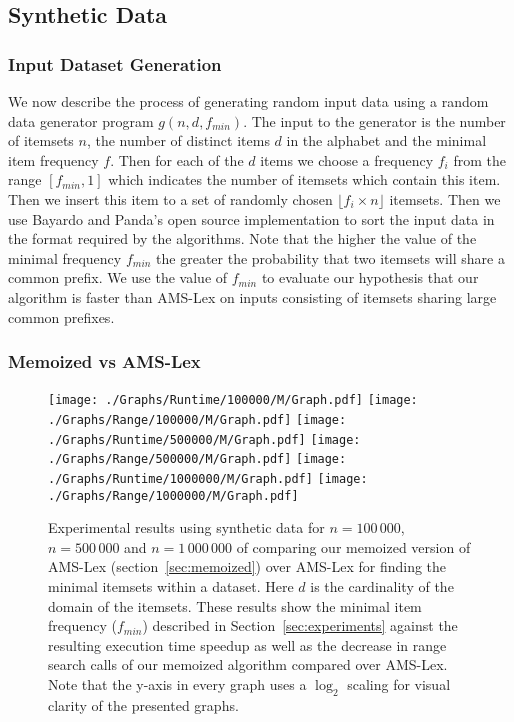 \documentclass[13pt,a4paper]{article}
\begin{document}
\subsection{Synthetic Data}
\label{sec:exp:synth}

\subsubsection{Input Dataset Generation}
We now describe the process of generating random input data using a random data generator program $g(n, d, f_{min})$. The input to the generator is the number of itemsets $n$, the number of distinct items $d$ in the alphabet and the minimal item frequency $f$. Then for each of the $d$ items we choose a frequency $f_i$ from the range $[f_{min}, 1]$ which indicates the number of itemsets which contain this item. Then we insert this item to a set of randomly chosen $ \lfloor f_i \times n \rfloor $ itemsets. Then we use Bayardo and  Panda's open source implementation to sort the input data in the format required by the algorithms. Note that the higher the value of the minimal frequency $f_{min}$ the greater the probability that two itemsets will share a common prefix. We use the value of $f_{min}$ to evaluate our hypothesis that our algorithm is faster than AMS-Lex on inputs consisting of itemsets sharing large common prefixes.

\subsubsection{Memoized vs AMS-Lex}
\label{sec:exp:synth:memo_AMS}

\begin{figure} [t]
	\centering
	\texttt{[image: ./Graphs/Runtime/100000/M/Graph.pdf]}
	\texttt{[image: ./Graphs/Range/100000/M/Graph.pdf]}
	\texttt{[image: ./Graphs/Runtime/500000/M/Graph.pdf]}
	\texttt{[image: ./Graphs/Range/500000/M/Graph.pdf]}
	\texttt{[image: ./Graphs/Runtime/1000000/M/Graph.pdf]}
	\texttt{[image: ./Graphs/Range/1000000/M/Graph.pdf]}
	\caption{Experimental results using synthetic data for $n = 100\,000$, $n = 500\,000$ and $n = 1\,000\,000$ of comparing our memoized version of AMS-Lex (section~\ref{sec:memoized}) over AMS-Lex for finding the minimal itemsets within a dataset. Here $d$ is the cardinality of the domain of the itemsets. These results show the minimal item frequency ($f_{min}$) described in Section~\ref{sec:experiments} against the resulting execution time speedup as well as the decrease in range search calls of our memoized algorithm compared over AMS-Lex. Note that the y-axis in every graph uses a $\log_2$ scaling for visual clarity of the presented graphs. }
	\label{fig:exp:memoized}
\end{figure}
\end{document}
